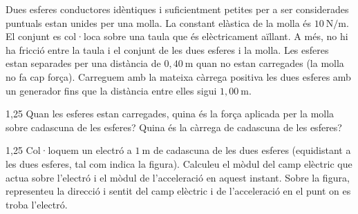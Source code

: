 Dues esferes conductores idèntiques i suficientment petites per a ser considerades puntuals estan unides per una molla. La constant elàstica de la molla és $10\ \mathrm{N/m}$. El conjunt es col·loca sobre una taula que és elèctricament aïllant. A més, no hi ha fricció entre la taula i el conjunt de les dues esferes i la molla. Les esferes estan separades per una distància de $0,40\ \mathrm{m}$ quan no estan carregades (la molla no fa cap força). Carreguem amb la mateixa càrrega positiva les dues esferes amb un generador fins que la distància entre elles sigui $1,00\ \mathrm{m}$.


\begin{apartat}{1,25}
Quan les esferes estan carregades, quina és la força aplicada per la molla sobre cadascuna de les esferes? Quina és la càrrega de cadascuna de les esferes?
\end{apartat}

\begin{apartat}{1,25}
Col·loquem un electró a $1\ \mathrm{m}$ de cadascuna de les dues esferes (equidistant a les dues esferes, tal com indica la figura). Calculeu el mòdul del camp elèctric que actua sobre l'electró i el mòdul de l'acceleració en aquest instant. Sobre la figura, representeu la direcció i sentit del camp elèctric i de l'acceleració en el punt on es troba l'electró.
\end{apartat}

